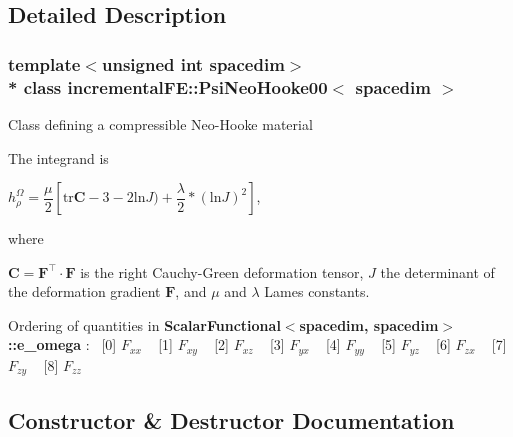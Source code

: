 \subsection{Detailed Description}
\subsubsection*{template$<$unsigned int spacedim$>$\\*
class incremental\+F\+E\+::\+Psi\+Neo\+Hooke00$<$ spacedim $>$}

Class defining a compressible Neo-\/\+Hooke material

The integrand is

$h^\Omega_\rho = \dfrac{\mu}{2} \left[ \mathrm{tr}\boldsymbol{C} - 3 - 2 \mathrm{ln}J ) + \dfrac{\lambda}{2} * \left(\mathrm{ln}J\right)^2 \right]$,

where

$ \boldsymbol{C} =\boldsymbol{F}^\top \cdot \boldsymbol{F} $ is the right Cauchy-\/\+Green deformation tensor, $J$ the determinant of the deformation gradient $\boldsymbol{F}$, and $\mu$ and $\lambda$ Lame\textquotesingle{}s constants.

Ordering of quantities in {\bf Scalar\+Functional$<$spacedim, spacedim$>$\+::e\+\_\+omega} \+:~\newline
 \mbox{[}0\mbox{]} $F_{xx}$ ~\newline
 \mbox{[}1\mbox{]} $F_{xy}$ ~\newline
 \mbox{[}2\mbox{]} $F_{xz}$ ~\newline
 \mbox{[}3\mbox{]} $F_{yx}$ ~\newline
 \mbox{[}4\mbox{]} $F_{yy}$ ~\newline
 \mbox{[}5\mbox{]} $F_{yz}$ ~\newline
 \mbox{[}6\mbox{]} $F_{zx}$ ~\newline
 \mbox{[}7\mbox{]} $F_{zy}$ ~\newline
 \mbox{[}8\mbox{]} $F_{zz}$ ~\newline
 

\subsection{Constructor \& Destructor Documentation}
